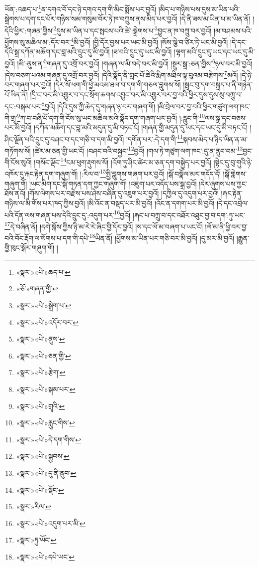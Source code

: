 ཡོན་:འཆད་པ་\footnote{«སྣར་»«པེ་»ཆད་པ་}ན་དགའ་བོ་དང་ཉེ་དགའ་དག་གི་མིང་སྨོས་པར་བྱའོ། །མིད་པ་གཉིས་པས་དུས་མ་ཡིན་པའི་སྒྲེགས་པ་དག་དང་པོར་གཉིས་སམ་གསུམ་བོར་ཏེ་ཁ་བཀྲུས་ནས་མིད་པར་བྱའོ། །དེ་ནི་ཟས་མ་ཡིན་པ་མ་ཡིན་ནོ། །དེའི་ཕྱིར་:གཞན་གྱིས་\footnote{«ཅོ་»གཞན་གྱི་}དུས་མ་ཡིན་པ་དང་སྤངས་པའི་ཚེ་:སྒྲེགས་པ་\footnote{«སྣར་»«པེ་»སྒྲེག་པ་}བྱུང་ན་ཁ་བཀྲུ་བར་བྱའོ། །མ་བཤམས་པའི་ཕྱོགས་སུ་མཆིལ་མ་:དོར་བར་\footnote{«སྣར་»«པེ་»འདོར་བར་}མི་བྱའོ། །བྱི་དོར་བྱས་པར་ཡང་མི་བྱའོ། །སོས་ལྕེ་བ་ཙིར་ཏེ་ཡང་མི་བྱའོ། །དེ་དང་དེའི་སྒྲ་དཀོན་མཆོག་དང་བླ་མའི་དྲུང་དུ་མི་བྱའོ། །ཟ་བའི་དྲུང་དུ་ཡང་མི་བྱའོ། །ལྷག་མའི་དྲུང་དུ་ཡང་དང་ཡང་དུ་མི་བྱའོ། །མི་:ནུས་ན་\footnote{«སྣར་»«པེ་»ནུས་}གཞན་དུ་འགྲོ་བར་བྱའོ། །གཞན་ལ་མི་བདེ་བར་མི་བྱའོ། །སྔུར་སྒྲ་:ཅན་གྱིས་\footnote{«སྣར་»«པེ་»ཅན་གྱི་}ཉལ་བར་མི་བྱའོ། །དེས་བཅག་པའམ་གཞན་དུ་འགྲོ་བར་བྱའོ། །དེའི་སྣོད་ནི་གླང་པོ་ཆེའི་རྨིག་མཐིལ་ལྟ་བུའམ་བརྩེགས་\footnote{«སྣར་»«པེ་»རྩེག་}མའོ། །དེ་ཉེ་བར་གཞག་པར་བྱའོ། །དེར་སོ་ཕག་གི་ཕྱེ་མའམ་ཐལ་བ་དག་གི་གཅལ་བླུགས་སོ། །སྦྲང་བུ་དག་བསྐྲད་པ་ནི་གཉེན་པོ་ཡིན་ནོ། །དྲི་ང་བར་མི་འགྱུར་བ་དང་སྲོག་ཆགས་འབྱུང་བར་མི་འགྱུར་བར་བྱ་བའི་ཕྱིར་དུས་དུས་སུ་བཀྲུ་བ་དང་:བསྐམ་པར་\footnote{«སྣར་»«པེ་»སྐམ་པར་}བྱའོ། །དེའི་དུས་ཀྱི་ཆེད་དུ་གཞན་ཉ་བར་གཞག་གོ། །མི་བྲེལ་བར་བྱ་བའི་ཕྱིར་གཙུག་ལག་ཁང་གི་གྲྭ་\footnote{«སྣར་»«པེ་»གྲྭའི་}ཀ་བ་བཞི་པོ་དག་གི་ངོས་སུ་ཡང་མཆིལ་མའི་སྣོད་དག་གཞག་པར་བྱའོ། །:རླུང་གི་\footnote{«སྣར་»«པེ་»རླུང་གིས་}ལས་སྒྲ་དང་བཅས་པར་མི་བྱའོ། །དཀོན་མཆོག་དང་བླ་མའི་མདུན་དུ་མི་བཏང་ངོ། །གཞན་གྱི་མདུན་དུ་ཡང་དང་ཡང་དུ་མི་བཏང་ངོ། །ཤིང་ལྗོན་པའི་དྲུང་དུ་བཤང་བ་དང་གཅི་བ་དག་མི་བྱའོ། །དགོན་པར་:དེ་དག་གི་\footnote{«སྣར་»«པེ་»དེ་དག་གིས་}སྐབས་མེད་པ་ཉིད་ཡིན་ན་མ་གཏོགས་སོ། །ཚེར་མ་ཅན་གྱི་ཡང་ངོ། །བཤང་བའི་བསྐྱབ་\footnote{«སྣར་»«པེ་»སྐྱབས་}བྱའོ། །གལ་ཏེ་གཙུག་ལག་ཁང་:དུ་ན་ནུབ་བམ་\footnote{«སྣར་»«པེ་»དུ་ནི་ནུབ་}བྱང་གི་ངོས་སུའོ། །གསོང་ལྡོང་\footnote{«སྣར་»«པེ་»སྡོང་}ངམ་ཕུག་རྡུགས་སོ། །འོག་ཏུ་ཤིང་ཚེར་མ་ཅན་དག་བསྐྱེད་པར་བྱའོ། །སྟེང་དུ་བུ་གུའི་ཉེ་འཁོར་དུ་རྐང་རྟེན་དག་གཞུག་གོ། །:རིལ་བ་\footnote{«སྣར་»རིལ་}སྤྱི་བླུགས་གཞག་པར་བྱའོ། །སྒོ་བསྣོལ་མར་གདོད་དོ། །སྒོ་གླེགས་གཞུག་གོ། །ཡང་མིག་དང་སྒོ་གཏན་དག་ཀྱང་གཞུག་གོ། །འཇུག་པར་འདོད་པས་སྒྲ་བྱའོ། །དེར་ཞུགས་པས་ཀྱང་ཐོས་ནའོ། །གོས་ལེགས་པར་བརྫེས་པས་ཤེས་བཞིན་དུ་འཇུག་པར་བྱའོ། །དཀྱིལ་དུ་འདུག་པར་བྱའོ། །རྐང་རྟེན་གཉིས་ལ་མི་གོས་པར་ཁད་ཀྱིས་བྱའོ། །མི་འོང་ན་བསྡད་པར་མི་བྱའོ། །འོང་ན་དགག་པར་མི་བྱའོ། །དེ་དང་འབྲེལ་པའི་དོན་ལས་གཞན་པས་དེའི་དྲུང་དུ་:འདུག་པར་\footnote{«སྣར་»«པེ་»འདུག་པར་མི་}བྱའོ། །རྐང་པ་བཀྲུ་བ་དང་འཐོར་འཐུང་བྱ་བ་དག་:ཏུ་ཡང་\footnote{«སྣར་»ཏུ་ཡོང་}དེ་བཞིན་ནོ། །དགེ་སྐོས་ཀྱིས་ཉི་མ་རེ་རེ་ཞིང་བྱི་དོར་བྱའོ། །ས་དང་ལོ་མ་བཞག་པ་ཡང་ངོ། །ལོ་མ་ནི་ཕྱི་བར་བྱ་བའི་བོང་རྡོག་ལ་སོགས་པ་དག་གི་དཔེ་\footnote{«སྣར་»«པེ་»དཔེ་ཡང་}ཡིན་ནོ། །ཕྱོགས་མ་ཡིན་པར་གཅི་བར་མི་བྱའོ། །དུ་མར་མི་བྱའོ། །རྒྱུན་གྱི་ཁུང་སྒོར་གཞུག་གོ། །
